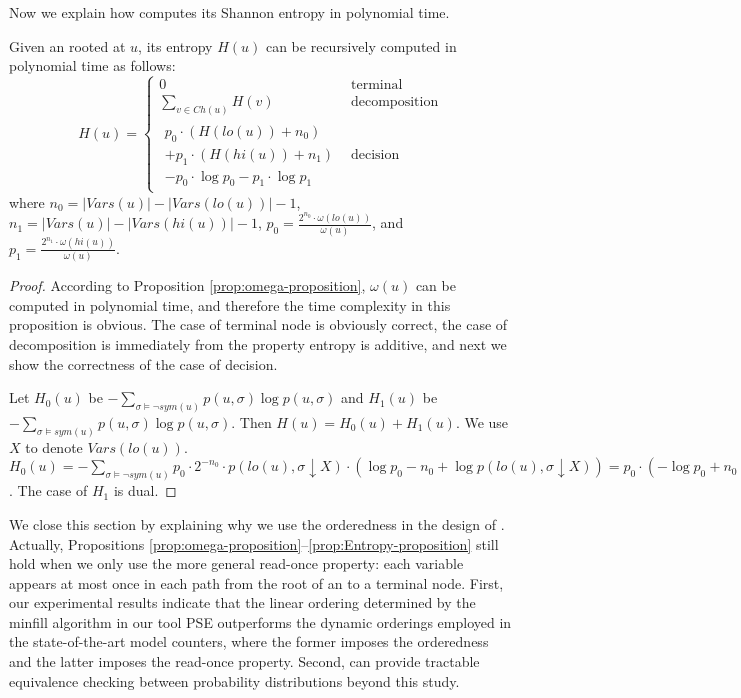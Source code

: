 	Now we explain how \ADDAND computes its Shannon entropy in polynomial time.
	\begin{proposition}\label{prop:Entropy-proposition}
		Given an \ADDAND rooted at $u$, its entropy $\mathit{H}(u)$ can be recursively computed in polynomial time as follows:
		\begin{equation*}
		\mathit{H}(u) =  
		\begin{cases}  
			0 & \text{terminal}   \\
			\sum_{v \in Ch(u)}{\mathit{H}(v)}  & \text{decomposition}   \\
			\begin{gathered}
				p_{0} \cdot (\mathit{H}(lo(u)) + n_0)\\
				+ p_{1} \cdot (\mathit{H}(hi(u)) + n_1)\\
				 - p_{0} \cdot \log p_{0} - p_{1} \cdot \log p_{1}
			\end{gathered} & \text{decision}
		
		\end{cases}
		\end{equation*}
		where  $n_0 = |\mathit{Vars}(u)| - |\mathit{Vars}(lo(u))| - 1 $, $n_1 = |\mathit{Vars}(u)| - |\mathit{Vars}(hi(u))| - 1$, $p_{0} = \frac{2^{n_0} \cdot \mathit{\omega}(lo(u))}{\omega(u)}$, and $p_{1} =  \frac{ 2^{n_1} \cdot \mathit{\omega}(hi(u))}{\omega(u)}$.  
       
		
		
		\begin{proof}
        According to Proposition \ref{prop:omega-proposition}, $\omega(u)$ can be computed in polynomial time, and therefore the time complexity in this proposition is obvious. The case of terminal node is obviously correct, the case of decomposition is immediately from the property entropy is additive, and next we show the correctness of the case of decision.

        Let $H_0(u)$ be $-\sum_{\sigma \models \lnot sym(u)} p(u,\sigma) \log p(u, \sigma)$ and $H_1(u)$ be $-\sum_{\sigma \models sym(u)} p(u,\sigma) \log p(u,\sigma)$. Then $H(u) = H_0(u) + H_1(u)$. 
        We use $X$ to denote  $\mathit{Vars}(lo(u))$.
        $H_0(u) = -\sum_{\sigma \models \lnot sym(u)} p_0 \cdot 2^{-n_0} \cdot p(lo(u),\sigma \downarrow X) \cdot \left(\log p_0 - n_0 + \log p(lo(u),\sigma \downarrow X) \right) = p_{0} \cdot \left(-\log p_{0} + n_0 + \mathit{H}(lo(u))\right)$. The case of $H_1$ is dual.
		\end{proof}
		
	\end{proposition}
	
We close this section by explaining why we use the orderedness in the design of \ADDAND.
Actually, Propositions \ref{prop:omega-proposition}--\ref{prop:Entropy-proposition} still hold when we only use the more general read-once property: each variable appears at most once in each path from the root of an \ADDAND to a terminal node.
First, our experimental results indicate that the linear ordering determined by the minfill algorithm in our tool PSE outperforms the dynamic orderings employed in the state-of-the-art model counters, where the former imposes the orderedness and the latter imposes the read-once property.
Second, \ADDAND can provide tractable equivalence checking between probability distributions beyond this study.
